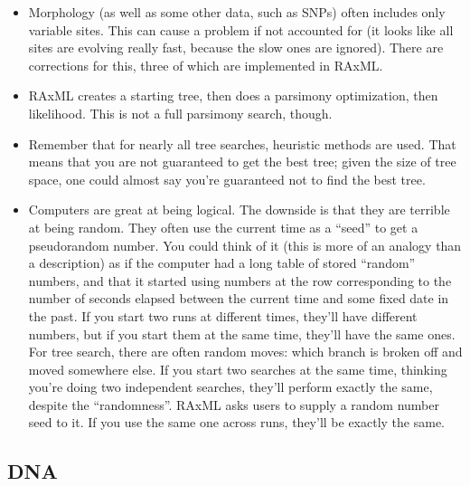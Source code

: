 \documentclass[]{article}
\providecommand{\tightlist}{%
  \setlength{\itemsep}{0pt}\setlength{\parskip}{0pt}}
\theoremstyle{definition}
\theoremstyle{definition}
\theoremstyle{definition}
\theoremstyle{remark}
\begin{document}
\begin{itemize}
\tightlist
\item
  Morphology (as well as some other data, such as SNPs) often includes
  only variable sites. This can cause a problem if not accounted for (it
  looks like all sites are evolving really fast, because the slow ones
  are ignored). There are corrections for this, three of which are
  implemented in RAxML.
\item
  RAxML creates a starting tree, then does a parsimony optimization,
  then likelihood. This is not a full parsimony search, though.
\item
  Remember that for nearly all tree searches, heuristic methods are
  used. That means that you are not guaranteed to get the best tree;
  given the size of tree space, one could almost say you're guaranteed
  not to find the best tree.
\item
  Computers are great at being logical. The downside is that they are
  terrible at being random. They often use the current time as a
  ``seed'' to get a pseudorandom number. You could think of it (this is
  more of an analogy than a description) as if the computer had a long
  table of stored ``random'' numbers, and that it started using numbers
  at the row corresponding to the number of seconds elapsed between the
  current time and some fixed date in the past. If you start two runs at
  different times, they'll have different numbers, but if you start them
  at the same time, they'll have the same ones. For tree search, there
  are often random moves: which branch is broken off and moved somewhere
  else. If you start two searches at the same time, thinking you're
  doing two independent searches, they'll perform exactly the same,
  despite the ``randomness''. RAxML asks users to supply a random number
  seed to it. If you use the same one across runs, they'll be exactly
  the same.
\end{itemize}

\hypertarget{dna}{%
\subsection{DNA}\label{dna}}
\end{document}
